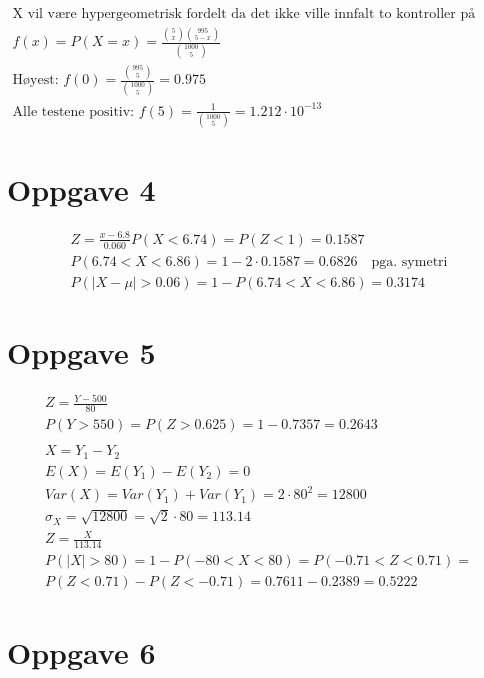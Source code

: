 \begin{gather*}
	\text{X vil være hypergeometrisk fordelt da det ikke ville innfalt to kontroller på samme transporten}
	\\
	f(x) = P(X = x) = \frac{\binom{5}{x} \binom{995}{5 - x}}{\binom{1000}{5}}
	\\
	\text{Høyest: } f(0) = \frac{\binom{995}{5}}{\binom{1000}{5}} = 0.975
	\\
	\text{Alle testene positiv: }
	f(5) = \frac{1}{\binom{1000}{5}} = 1.212 \cdot 10^{-13}
\end{gather*}


\section*{Oppgave 4}


\begin{gather*}
	Z = \frac{x - 6.8}{0.060}
	P(X < 6.74)	= P(Z < 1) = 0.1587
	\\
	P(6.74 < X < 6.86) = 1 - 2 \cdot 0.1587 = 0.6826 \quad \text{pga. symetri}
	\\
	P(|X - \mu| > 0.06) = 1 - P(6.74 < X < 6.86) = 0.3174
\end{gather*}


\newpage


\section*{Oppgave 5}


\begin{gather*}
	Z = \frac{Y - 500}{80}
	\\
	P(Y > 550) = P(Z > 0.625) = 1 - 0.7357 = 0.2643
	\\
	\\
	X = Y_1 - Y_2
	\\
	E(X) = E(Y_1) - E(Y_2) = 0
	\\
	Var(X) = Var(Y_1) + Var(Y_1) = 2 \cdot 80^2 = 12800
	\\
	\sigma_X = \sqrt{12800} = \sqrt{2} \cdot 80 = 113.14
	\\
	Z = \frac{X}{113.14}
	\\
	P(|X| > 80) = 1 - P(-80 < X < 80) = P(-0.71 < Z < 0.71) =
	\\
	P(Z < 0.71) - P(Z < -0.71) = 0.7611 - 0.2389 = 0.5222
\end{gather*}


\section*{Oppgave 6}



